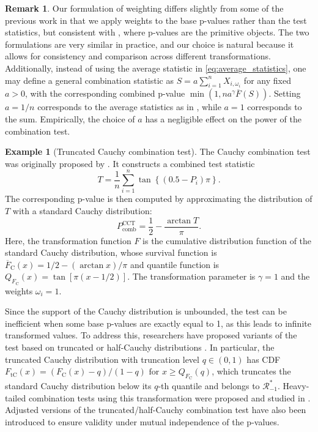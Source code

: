 \documentclass[12pt]{article}
\theoremstyle{plain}
\theoremstyle{plain}
\theoremstyle{definition}
\newtheorem{exmp}{Example}[section]
\newtheorem{rem}{Remark}[section]
\begin{document}
\begin{rem}
Our formulation of weighting differs slightly from some of the previous work \citep{liu2020cauchy,fang2023heavy,gui2023aggregating} in that we apply weights to the base p-values rather than the test statistics, but consistent with \cite{wilson2019harmonic, vovk2020combining}, where p-values are the primitive objects. 
The two formulations are very similar in practice, and our choice is natural because it allows for consistency and comparison across different transformations.  
Additionally, instead of using the average statistic in \eqref{eq:average_statistics}, one may define a general combination statistic as
$S=a\sum_{i=1}^nX_{i,\omega_i}$ for any fixed $a >0$, with the corresponding combined p-value $\min\left(1, na^{\gamma} \overline F(S)\right)$. %
Setting $a = 1/n$ corresponds to the average statistics as in , while $a= 1$ corresponds to the sum. Empirically, the choice of $a$ has a negligible effect on the power of the combination test.
\end{rem}



\begin{exmp}[Truncated Cauchy combination test]
\label{exmp:truncated_cauchy}
The Cauchy combination test was originally proposed by \citet{liu2020cauchy}. It constructs a combined test statistic
$$T = \frac{1}{n}\sum_{i=1}^n \tan\left\{(0.5-P_i)\pi\right\}.$$
The corresponding p-value is then computed by approximating the distribution of $T$ with a standard Cauchy distribution:
$$P_{\mathrm{comb}}^{\mathrm{CCT}}=\frac{1}{2}-\frac{\arctan T}{\pi}.$$
Here, the transformation function $F$ is the cumulative distribution function of the standard Cauchy distribution, whose survival function is $\overline{F}_\mathrm{C}(x) = 1/2 - (\arctan x)/\pi$ and quantile function is $Q_{F_\mathrm{C}}(x)=\tan[\pi(x-1/2)]$. The transformation parameter is $\gamma = 1$ and the weights $\omega_i = 1$.

Since the support of the Cauchy distribution is unbounded, the test can be inefficient when some base p-values are exactly equal to 1, as this leads to infinite transformed values. To address this, researchers have proposed variants of the test based on truncated or half-Cauchy distributions \citep{fang2023heavy, gui2023aggregating, liu2025heavily}. In particular, the truncated Cauchy distribution with truncation level $q \in (0, 1)$ has CDF
$F_{\mathrm{tC}}(x) = (F_{\mathrm{C}}(x) - q)/(1 - q) \text{ for } x \geq Q_{F_{\mathrm{C}}}(q)$,
which truncates the standard Cauchy distribution below its $q$-th quantile and belongs to $\mathscr{R}_{-1}^*$. Heavy-tailed combination tests using this transformation were proposed and studied in \cite{gui2023aggregating}.  Adjusted versions of the truncated/half-Cauchy combination test have also been introduced \citep{fang2023heavy, liu2025heavily} to ensure validity under mutual independence of the p-values.
    
\end{exmp}
\end{document}
